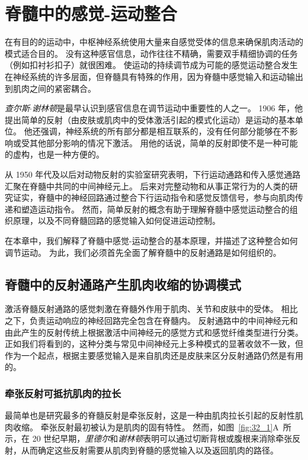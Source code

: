 \chapter{脊髓中的感觉-运动整合} \label{chap:chap32}

在有目的的运动中，中枢神经系统使用大量来自感觉受体的信息来确保肌肉活动的模式适合目的。
没有这种感官信息，动作往往不精确，需要双手精细协调的任务（例如扣衬衫扣子）就很困难。
使运动的持续调节成为可能的感觉运动整合发生在神经系统的许多层面，但脊髓具有特殊的作用，因为脊髓中感觉输入和运动输出到肌肉之间的紧密耦合。


\textit{查尔斯$\cdot$谢林顿}是最早认识到感官信息在调节运动中重要性的人之一。
1906 年，他提出简单的反射（由皮肤或肌肉中的受体激活引起的模式化运动）是运动的基本单位。
他还强调，神经系统的所有部分都是相互联系的，没有任何部分能够在不影响或受其他部分影响的情况下激活。
用他的话说，简单的反射即使不是一种可能的虚构，也是一种方便的。


从 1950 年代及以后对动物反射的实验室研究表明，下行运动通路和传入感觉通路汇聚在脊髓中共同的中间神经元上。
后来对完整动物和从事正常行为的人类的研究证实，脊髓中的神经回路通过整合下行运动指令和感觉反馈信号，参与向肌肉传递和塑造运动指令。
然而，简单反射的概念有助于理解脊髓中感觉运动整合的组织原理，以及不同脊髓回路的感觉输入如何促进运动控制。


在本章中，我们解释了脊髓中感觉-运动整合的基本原理，并描述了这种整合如何调节运动。
为此，我们必须首先全面了解脊髓中的反射通路是如何组织的。



\section{脊髓中的反射通路产生肌肉收缩的协调模式}

激活脊髓反射通路的感觉刺激在脊髓外作用于肌肉、关节和皮肤中的受体。
相比之下，负责运动响应的神经回路完全包含在脊髓内。 
反射通路中的中间神经元和由此产生的反射传统上根据激活中间神经元的感觉方式和感觉纤维类型进行分类。
正如我们将看到的，这种分类与常见中间神经元上多种模式的显著收敛不一致，但作为一个起点，根据主要感觉输入是来自肌肉还是皮肤来区分反射通路仍然是有用的。



\subsection{牵张反射可抵抗肌肉的拉长}

最简单也是研究最多的脊髓反射是牵张反射，这是一种由肌肉拉长引起的反射性肌肉收缩。
牵张反射最初被认为是肌肉的固有特性。
然而，如图~\ref{fig:32_1}A~所示，在 20 世纪早期，\textit{里德尔}和\textit{谢林顿}表明可以通过切断背根或腹根来消除牵张反射，从而确定这些反射需要从肌肉到脊髓的感觉输入以及返回肌肉的路径。


